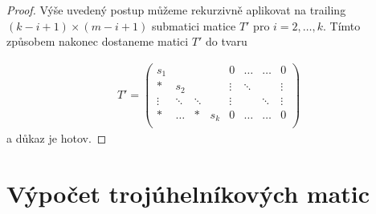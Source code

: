 \begin{proof}
Výše uvedený postup můžeme rekurzivně aplikovat na trailing
$ (k - i + 1) \times (m - i + 1) $ submatici matice $ T' $ pro $ i = 2,\dots, k$.
Tímto způsobem nakonec dostaneme matici $ T' $ do tvaru

\begin{align} \label{extra_cols_reduced}
T' =
    \left(
    \begin{array}{cccc|cccc}
        s_1    &        &        &     & 0       & \hdots & \hdots & 0      \\
        \ast   & s_2    &        &     & \vdots  & \ddots &        & \vdots \\
        \vdots & \ddots & \ddots &     & \vdots  &        & \ddots & \vdots \\
        \ast   & \hdots & \ast   & s_k & 0       & \hdots & \hdots & 0      \\
    \end{array}
    \right)
\end{align}
a důkaz je hotov.
\end{proof}


\section{Výpočet \snf{} trojúhelníkových matic}

